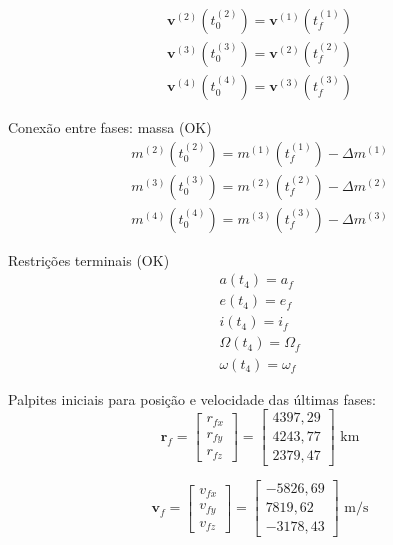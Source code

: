 \documentclass[10pt,a4paper]{article}
\begin{document}
	\begin{equation}
		\begin{gathered}
			\mathbf{v}^{(2)} \left( t_0^{(2)} \right) = \mathbf{v}^{(1)} \left( t_f^{(1)} \right) \\
			\mathbf{v}^{(3)} \left( t_0^{(3)} \right) = \mathbf{v}^{(2)} \left( t_f^{(2)} \right) \\
			\mathbf{v}^{(4)} \left( t_0^{(4)} \right) = \mathbf{v}^{(3)} \left( t_f^{(3)} \right) 
		\end{gathered}
	\end{equation}
	
	Conexão entre fases: massa (OK)
	\begin{equation}
		\begin{gathered}
			m^{(2)} \left( t_0^{(2)} \right)  = m^{(1)} \left( t_f^{(1)} \right) - \Delta m^{(1)} \\
			m^{(3)} \left( t_0^{(3)} \right)  = m^{(2)} \left( t_f^{(2)} \right) - \Delta m^{(2)} \\
			m^{(4)} \left( t_0^{(4)} \right)  = m^{(3)} \left( t_f^{(3)} \right) - \Delta m^{(3)} 			
		\end{gathered}
	\end{equation}
	
	Restrições terminais (OK)
	\begin{equation}
		\begin{gathered}
			a(t_4) = a_f \\
			e(t_4) = e_f \\
			i(t_4) = i_f \\
			\Omega(t_4) = \Omega_f \\
			\omega(t_4) = \omega_f 
		\end{gathered}
	\end{equation}
	
	Palpites iniciais para posição e velocidade das últimas fases: 
	\begin{equation}
		\mathbf{r}_f = 
		\begin{bmatrix}
			r_{fx} \\
			r_{fy} \\
			r_{fz} 
		\end{bmatrix} = 
		\begin{bmatrix}
			4397,29 \\
			4243,77 \\
			2379,47 
		\end{bmatrix} \text{ km}
	\end{equation}
	
	\begin{equation}
		\mathbf{v}_f = 
		\begin{bmatrix}
			v_{fx} \\
			v_{fy} \\
			v_{fz} 
		\end{bmatrix} = 
		\begin{bmatrix}
			-5826,69 \\
			7819,62 \\
			-3178,43
		\end{bmatrix} \text{ m/s}
	\end{equation}
	
\end{document}
